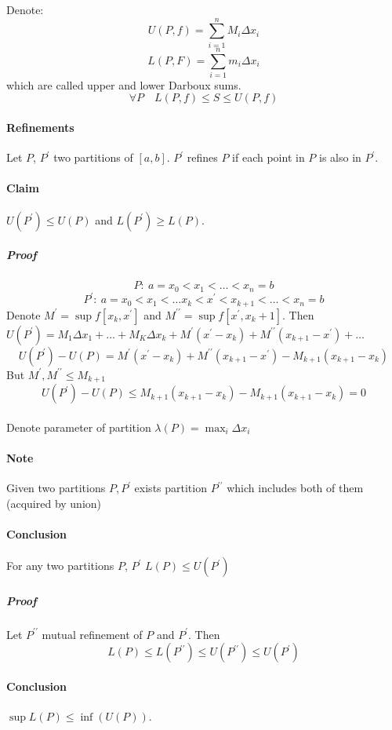 Denote:
$$U(P,f) = \sum_{i=1}^n M_i \Delta x_i$$
$$L(P,F) = \sum_{i=1}^n m_i \Delta x_i$$
which are called upper and lower Darboux sums.
$$\forall P \quad L(P,f) \leq S \leq U(P,f)$$

\paragraph{Refinements} Let $P$, $P^\prime$ two partitions of $[a,b]$. $P^\prime$ refines $P$ if each point in $P$ is also in $P^\prime$. 
\paragraph{Claim} $U(P^\prime) \leq U(P)$ and $L(P^\prime) \geq L(P)$.
\subparagraph{Proof} 
$$P:\: a=x_0<x_1<\dots<x_n=b$$
$$P^\prime:\: a=x_0<x_1<\dots x_k<x^\prime < x_{k+1}< \dots<x_n=b$$
Denote $M^\prime = \sup f [x_k, x^\prime]$ and $M^{\prime \prime} = \sup f [x^\prime, x_k+1]$.
Then $U(P^\prime) = M_1 \Delta x_1 + \dots + M_K \Delta x_k + M^\prime \left( x^\prime - x_k \right) + M^{\prime \prime} \left( x_{k+1} - x^\prime \right) + \dots$
$$U(P^\prime)-U(P) = M^\prime \left( x^\prime - x_k \right) + M^{\prime \prime} \left( x_{k+1} - x^\prime \right) - M_{k+1} \left( x_{k+1} - x_k \right)$$
But $M^\prime, M^{\prime \prime} \leq M_{k+1}$
$$U(P^\prime)-U(P) \leq M_{k+1} \left(x_{k+1} - x_k\right) -  M_{k+1} \left(x_{k+1} - x_k\right) = 0$$

\paragraph{} Denote parameter of partition $\lambda(P) = \max_i \Delta x_i$
\paragraph{Note} Given two partitions $P, P^\prime$ exists partition $P^{\prime \prime}$ which includes both of them (acquired by union)
\paragraph{Conclusion} For any two partitions $P$, $P^\prime$ $L(P) \leq U(P^\prime)$
\subparagraph{Proof} Let $P^{\prime \prime}$ mutual refinement of $P$ and $P^\prime$. Then
$$L(P) \leq L(P^{\prime \prime}) \leq U(P^{\prime \prime}) \leq U(P^\prime)$$
\paragraph{Conclusion} $\sup L(P) \leq \inf (U(P))$.
